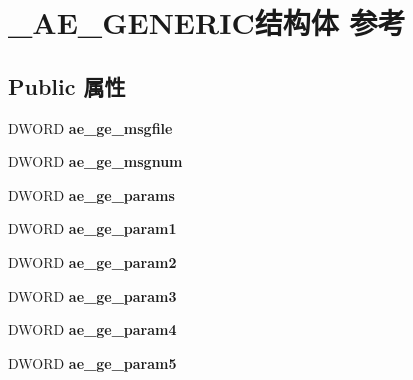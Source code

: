 \hypertarget{struct___a_e___g_e_n_e_r_i_c}{}\section{\+\_\+\+A\+E\+\_\+\+G\+E\+N\+E\+R\+I\+C结构体 参考}
\label{struct___a_e___g_e_n_e_r_i_c}
\subsection*{Public 属性}
\begin{DoxyCompactItemize}
\item 
\mbox{\label{struct___a_e___g_e_n_e_r_i_c_a5c2ba290c01e591d0e5e9df1cd680df4}} 
D\+W\+O\+RD {\bfseries ae\+\_\+ge\+\_\+msgfile}
\item 
\mbox{\label{struct___a_e___g_e_n_e_r_i_c_ac73067e0932fbc07919240f6a818d20a}} 
D\+W\+O\+RD {\bfseries ae\+\_\+ge\+\_\+msgnum}
\item 
\mbox{\label{struct___a_e___g_e_n_e_r_i_c_a870546348e768e4c239cb155ea7c9469}} 
D\+W\+O\+RD {\bfseries ae\+\_\+ge\+\_\+params}
\item 
\mbox{\label{struct___a_e___g_e_n_e_r_i_c_a444c24e8d47940792cadf0e2f6d46461}} 
D\+W\+O\+RD {\bfseries ae\+\_\+ge\+\_\+param1}
\item 
\mbox{\label{struct___a_e___g_e_n_e_r_i_c_a4a06f6d5a6798499a488b72c7efadd94}} 
D\+W\+O\+RD {\bfseries ae\+\_\+ge\+\_\+param2}
\item 
\mbox{\label{struct___a_e___g_e_n_e_r_i_c_a45e8b1d51b6fe1d019ed085261edcb21}} 
D\+W\+O\+RD {\bfseries ae\+\_\+ge\+\_\+param3}
\item 
\mbox{\label{struct___a_e___g_e_n_e_r_i_c_a34ba3ffc4e905057b41773a647e90395}} 
D\+W\+O\+RD {\bfseries ae\+\_\+ge\+\_\+param4}
\item 
\mbox{\label{struct___a_e___g_e_n_e_r_i_c_a8aa29355f4ac785876fd4249c4109635}} 
D\+W\+O\+RD {\bfseries ae\+\_\+ge\+\_\+param5}

\end{DoxyCompactItemize}
